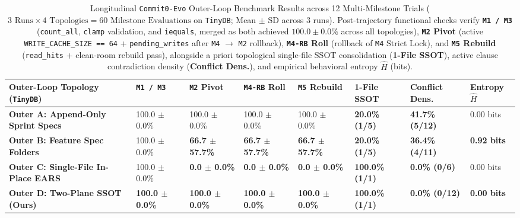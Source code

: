 \documentclass[11pt,a4paper,copyright]{google}
\begin{document}
\begin{table}[t!]
\centering
\caption{Longitudinal \texttt{Commit0-Evo} Outer-Loop Benchmark Results across 12 Multi-Milestone Trials ($3\text{ Runs} \times 4\text{ Topologies} = 60\text{ Milestone Evaluations}$ on \texttt{TinyDB}; Mean $\pm$ SD across 3 runs). Post-trajectory functional checks verify \textbf{\texttt{M1 / M3}} (\texttt{count\_all}, \texttt{clamp} validation, and \texttt{iequals}, merged as both achieved $100.0 \pm 0.0\%$ across all topologies), \textbf{\texttt{M2} Pivot} (active \texttt{WRITE\_CACHE\_SIZE == 64} + \texttt{pending\_writes} after \texttt{M4} $\to$ \texttt{M2} rollback), \textbf{\texttt{M4-RB} Roll} (rollback of \texttt{M4} Strict Lock), and \textbf{\texttt{M5} Rebuild} (\texttt{read\_hits} + clean-room rebuild pass), alongside a priori topological single-file SSOT consolidation (\textbf{1-File SSOT}), active clause contradiction density (\textbf{Conflict Dens.}), and empirical behavioral entropy $\hat{H}$ (bits).}
\label{tab:suite2_results}
\footnotesize
\setlength{\tabcolsep}{3.5pt}
\begin{tabularx}{\textwidth}{Y C{1.40cm} C{1.55cm} C{1.55cm} C{1.55cm} C{1.50cm} C{1.85cm} C{1.35cm}}
\toprule
\textbf{Outer-Loop Topology (\texttt{TinyDB})} & \textbf{\texttt{M1 / M3}} & \textbf{\texttt{M2} Pivot} & \textbf{\texttt{M4-RB} Roll} & \textbf{\texttt{M5} Rebuild} & \textbf{1-File SSOT} & \textbf{Conflict Dens.} & \textbf{Entropy $\hat{H}$} \\
\midrule
\textbf{Outer A: Append-Only Sprint Specs} & 100.0 $\pm$ 0.0\% & 100.0 $\pm$ 0.0\% & 100.0 $\pm$ 0.0\% & 100.0 $\pm$ 0.0\% & \textcolor{evalFail}{\textbf{20.0\% (1/5)}} & \textcolor{evalFail}{\textbf{41.7\% (5/12)}} & 0.00 bits \\
\addlinespace[2pt]
\textbf{Outer B: Feature Spec Folders} & 100.0 $\pm$ 0.0\% & \textcolor{evalFail}{\textbf{66.7 $\pm$ 57.7\%}} & \textcolor{evalFail}{\textbf{66.7 $\pm$ 57.7\%}} & \textcolor{evalFail}{\textbf{66.7 $\pm$ 57.7\%}} & \textcolor{evalFail}{\textbf{20.0\% (1/5)}} & \textcolor{evalFail}{\textbf{36.4\% (4/11)}} & \textcolor{evalFail}{\textbf{0.92 bits}} \\
\addlinespace[2pt]
\textbf{Outer C: Single-File In-Place EARS} & 100.0 $\pm$ 0.0\% & \textcolor{evalFail}{\textbf{0.0 $\pm$ 0.0\%}} & \textcolor{evalFail}{\textbf{0.0 $\pm$ 0.0\%}} & \textcolor{evalFail}{\textbf{0.0 $\pm$ 0.0\%}} & \textcolor{evalPass}{\textbf{100.0\% (1/1)}} & \textcolor{evalPass}{\textbf{0.0\% (0/6)}} & 0.00 bits \\
\addlinespace[2pt]
\textbf{Outer D: Two-Plane SSOT (Ours)} & \textbf{100.0 $\pm$ 0.0\%} & \textcolor{evalPass}{\textbf{100.0 $\pm$ 0.0\%}} & \textcolor{evalPass}{\textbf{100.0 $\pm$ 0.0\%}} & \textcolor{evalPass}{\textbf{100.0 $\pm$ 0.0\%}} & \textcolor{evalPass}{\textbf{100.0\% (1/1)}} & \textcolor{evalPass}{\textbf{0.0\% (0/12)}} & \textcolor{evalPass}{\textbf{0.00 bits}} \\
\bottomrule
\end{tabularx}
\end{table}
\end{document}
